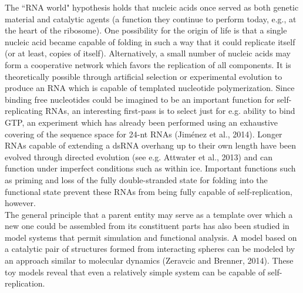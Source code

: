 \documentclass{article}
\begin{document}
The ``RNA world" hypothesis holds that nucleic acids once served as both genetic material and catalytic agents (a function they continue to perform today, e.g., at the heart of the ribosome). One possibility for the origin of life is that a single nucleic acid became capable of folding in such a way that it could replicate itself (or at least, copies of itself). Alternatively, a small number of nucleic acids may form a cooperative network which favors the replication of all components. It is theoretically possible through artificial selection or experimental evolution to produce an RNA which is capable of templated nucleotide polymerization. Since binding free nucleotides could be imagined to be an important function for self-replicating RNAs, an interesting first-pass is to select just for e.g. ability to bind GTP, an experiment which has already been performed using an exhaustive covering of the sequence space for 24-nt RNAs (Jim\'{e}nez et al., 2014). Longer RNAs capable of extending a dsRNA overhang up to their own length have been evolved through directed evolution (see e.g. Attwater et al., 2013) and can function under imperfect conditions such as within ice. Important functions such as priming and loss of the fully double-stranded state for folding into the functional state prevent these RNAs from being fully capable of self-replication, however.\\

The general principle that a parent entity may serve as a template over which a new one could be assembled from its constituent parts has also been studied in model systems that permit simulation and functional analysis. A model based on a catalytic pair of structures formed from interacting spheres can be modeled by an approach similar to molecular dynamics (Zeravcic and Brenner, 2014). These toy models reveal that even a relatively simple system can be capable of self-replication.
\end{document}
